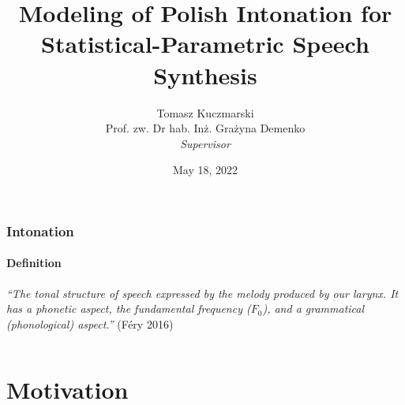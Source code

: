 \documentclass[a4paper,9pt]{beamer}
\theoremstyle{mytheoremstyle}
\begin{document}
\title[Modeling of Polish Intonation for SPSS]{Modeling of Polish Intonation for Statistical-Parametric Speech Synthesis}
\author[Tomasz Kuczmarski]{Tomasz Kuczmarski\\
\vspace{0.5cm}
\small{Prof. zw. Dr hab. In\.z. Gra\.zyna Demenko}\\
\textit{\tiny{Supervisor}}}

\date{\tiny{May 18, 2022}}

%
\begin{frame}
\titlepage
\end{frame}




\begin{frame}
\frametitle{Intonation}
\framesubtitle{Definition}
\vspace{2cm}
\textit<1-2>{``The tonal structure of speech expressed by the melody produced by our larynx. It has a phonetic aspect, the fundamental frequency ($F_{0}$), and a grammatical (phonological) aspect.''} (F\'ery 2016)
\begin{columns}
\vspace{0.5cm}
\end{columns}
\end{frame}

\section{Motivation}
\end{document}
